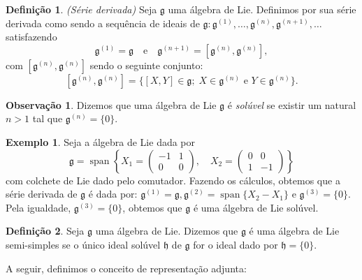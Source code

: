 \documentclass[twoside,openright,titlepage,numbers=noenddot,headinclude,  lineheaders footinclude=true,cleardoublepage=empty,
                                BCOR=5mm,paper=a4,fontsize=12pt ]{scrbook}
\theoremstyle{definition}
\newtheorem{definicao}{Definição}[chapter]
\newtheorem{exmp}{Exemplo}[section]
\newtheorem*{obs*}{Observação}
\DeclareMathOperator{\spn}{span}
\begin{document}
\begin{definicao} 
\textit{(Série derivada)} Seja $\mathfrak{g}$ uma álgebra de Lie. Definimos por sua série
derivada como sendo a sequência de ideais de $\mathfrak{g}: \mathfrak{g}^{(1)}, \ldots, 
\mathfrak{g}^{(n)}, \mathfrak{g}^{(n+1)},\ldots$ satisfazendo
\[
\mathfrak{g}^{(1)} = \mathfrak{g} \quad \text{e} \quad \mathfrak{g}^{(n+1)} = [\mathfrak{g}^{(n)}, \mathfrak{g}^{(n)}],
\]
com $[\mathfrak{g}^{(n)}, \mathfrak{g}^{(n)}]$ sendo o seguinte conjunto:
\[
[\mathfrak{g}^{(n)}, \mathfrak{g}^{(n)}] = \{ [X,Y] \in \mathfrak{g}; \;
    X \in \mathfrak{g}^{(n)} \text{ e } Y \in \mathfrak{g}^{(n)}\}.
\]
\end{definicao}

\begin{obs*}
Dizemos que uma álgebra de Lie $\mathfrak{g}$ é \textit{solúvel} se existir um natural $n > 1$ tal que
$\mathfrak{g}^{(n)} = \{0\}$.
\end{obs*}

\begin{exmp}
Seja a álgebra de Lie dada por
\[
\mathfrak{g} = 
\spn \left\{
X_1 =
\begin{pmatrix}
-1 & 1 \\
0 & 0 
\end{pmatrix}
, \quad
X_2 =
\begin{pmatrix}
0 & 0 \\
1 & -1 
\end{pmatrix}
\right\}
\]
com colchete de Lie dado pelo comutador. Fazendo os cálculos, obtemos que a série derivada
de $\mathfrak{g}$ é dada por:
$\mathfrak{g}^{(1)} = \mathfrak{g}, \mathfrak{g}^{(2)} = \spn\{X_2 - X_1\}$ e $\mathfrak{g}^{(3)} = \{0\}$.
Pela igualdade, $\mathfrak{g}^{(3)} = \{0\}$,
obtemos que $\mathfrak{g}$ é uma álgebra de Lie solúvel.
\end{exmp}

\begin{definicao}
Seja $\mathfrak{g}$ uma álgebra de Lie. Dizemos que $\mathfrak{g}$ é uma álgebra de Lie semi-simples 
se o único ideal solúvel $\mathfrak{h}$ de $\mathfrak{g}$ for o ideal dado por
$\mathfrak{h} = \{0\}$.
\end{definicao}

A seguir, definimos o conceito de representação adjunta:
\end{document}
